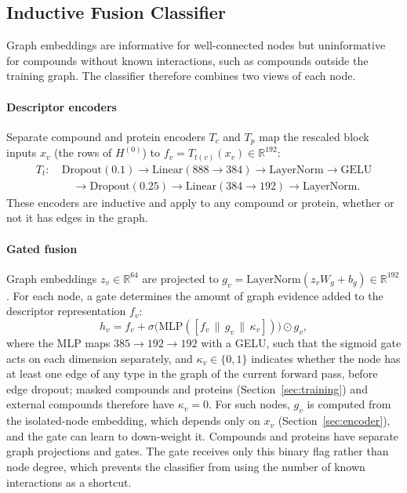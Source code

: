 \documentclass[11pt,letterpaper]{article}
\begin{document}
\subsection{Inductive Fusion Classifier}
Graph embeddings are informative for well-connected nodes but uninformative for compounds without known interactions, such as compounds outside the training graph. The classifier therefore combines two views of each node.

\paragraph{Descriptor encoders}
Separate compound and protein encoders $T_c$ and $T_p$ map the rescaled block inputs $x_v$ (the rows of $H^{(0)}$) to $f_v=T_{t(v)}(x_v)\in\mathbb{R}^{192}$:
\[
\begin{aligned}
T_t:\ &\mathrm{Dropout}(0.1)\to\mathrm{Linear}(888\to 384)\to\mathrm{LayerNorm}\to\mathrm{GELU}\\
&\quad\to\mathrm{Dropout}(0.25)\to\mathrm{Linear}(384\to 192)\to\mathrm{LayerNorm}.
\end{aligned}
\]
These encoders are inductive and apply to any compound or protein, whether or not it has edges in the graph.

\paragraph{Gated fusion}
Graph embeddings $z_v\in\mathbb{R}^{64}$ are projected to $g_v=\mathrm{LayerNorm}(z_v W_g + b_g)\in\mathbb{R}^{192}$. For each node, a gate determines the amount of graph evidence added to the descriptor representation $f_v$:
\[
h_v = f_v + \sigma\!\big(\mathrm{MLP}([f_v\,\|\,g_v\,\|\,\kappa_v])\big)\odot g_v,
\]
where the MLP maps $385\to192\to192$ with a GELU, such that the sigmoid gate acts on each dimension separately, and $\kappa_v\in\{0,1\}$ indicates whether the node has at least one edge of any type in the graph of the current forward pass, before edge dropout; masked compounds and proteins (Section~\ref{sec:training}) and external compounds therefore have $\kappa_v=0$. For such nodes, $g_v$ is computed from the isolated-node embedding, which depends only on $x_v$ (Section~\ref{sec:encoder}), and the gate can learn to down-weight it. Compounds and proteins have separate graph projections and gates. The gate receives only this binary flag rather than node degree, which prevents the classifier from using the number of known interactions as a shortcut.
\end{document}

